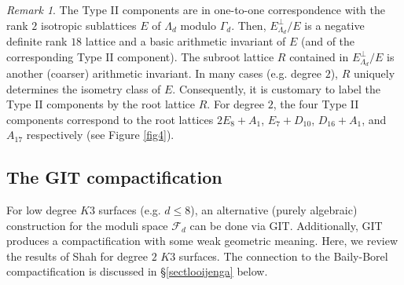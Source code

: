 \documentclass{amsart}
\numberwithin{equation}{section}
\theoremstyle{plain}
\theoremstyle{remark}
\newtheorem{remark}[equation]{Remark}
\theoremstyle{definition}
\newcommand{\calF}{\mathcal{F}}
\begin{document}
\begin{remark}\label{labelbb}
The Type II components are in one-to-one correspondence with the rank $2$ isotropic sublattices $E$ of $\Lambda_d$ modulo $\Gamma_d$. Then, $E^\perp_{\Lambda_d}/E$  is a negative definite rank $18$ lattice and a basic arithmetic invariant of $E$ (and of the corresponding  Type II component).  The subroot lattice $R$ contained in $E^\perp_{\Lambda_d}/E$ is another (coarser) arithmetic invariant. In many cases (e.g. degree $2$), $R$ uniquely determines the isometry class of $E$. Consequently, it is customary to label the Type II components by the root lattice $R$. For degree $2$, the four Type II components correspond to the root lattices $2E_8+ A_1$, $E_7+D_{10}$, $D_{16}+ A_1$, and $A_{17}$ respectively (see Figure \ref{fig4}).
\end{remark}


\subsection{The GIT compactification}\label{sectshah}
For low degree $K3$ surfaces (e.g. $d\le 8$), an alternative (purely algebraic) construction for the moduli space $\calF_d$ can be done via GIT. Additionally, GIT produces a compactification with some weak geometric meaning. Here, we review the results of Shah \cite{shah} for degree $2$ $K3$ surfaces. The connection to the Baily-Borel compactification is discussed in \S\ref{sectlooijenga} below. 
 
\end{document}
